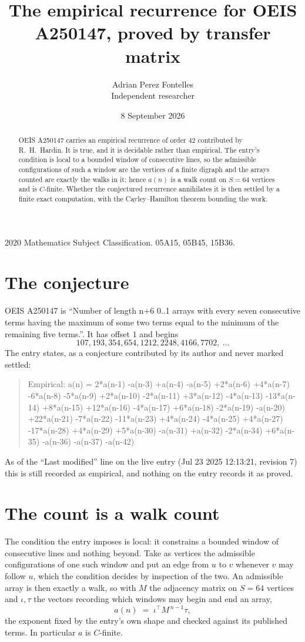 \documentclass[11pt,a4paper]{article}
\title{The empirical recurrence for OEIS A250147, proved by transfer matrix}
\author{Adrian Perez Fontelles\\ \small Independent researcher}
\date{8 September 2026}
\theoremstyle{plain}
\theoremstyle{definition}
\begin{document}
\maketitle

\begin{abstract}
OEIS A250147 carries an empirical recurrence of order $42$ contributed by R.~H.~Hardin. It is
true, and it is decidable rather than empirical. The entry's condition is local to a bounded window of consecutive lines, so
the admissible configurations of such a window are the vertices of a finite digraph and the
arrays counted are exactly the walks in it; hence $a(n)$ is a walk count on $S=64$ vertices
and is $C$-finite. Whether the conjectured recurrence annihilates it is then settled by a
finite exact computation, with the Cayley--Hamilton theorem bounding the work.
\end{abstract}

\noindent\small 2020 Mathematics Subject Classification. 05A15, 05B45, 15B36.\normalsize

\section{The conjecture}

OEIS A250147 is ``Number of length n+6 0..1 arrays with every seven consecutive terms having the maximum of some two terms equal to the minimum of the remaining five terms.''. It has offset $1$ and begins
\[
107, 193, 354, 654, 1212, 2248, 4166, 7702,\ \dots
\]
The entry states, as a conjecture contributed by its author and never marked settled:
\begin{quote}
Empirical: a(n) = 2*a(n-1) -a(n-3) +a(n-4) -a(n-5) +2*a(n-6) +4*a(n-7) -6*a(n-8) -5*a(n-9) +2*a(n-10) -2*a(n-11) +3*a(n-12) -4*a(n-13) -13*a(n-14) +8*a(n-15) +12*a(n-16) -4*a(n-17) +6*a(n-18) -2*a(n-19) -a(n-20) +22*a(n-21) -7*a(n-22) -11*a(n-23) +4*a(n-24) -4*a(n-25) +4*a(n-27) -17*a(n-28) +4*a(n-29) +5*a(n-30) -a(n-31) +a(n-32) -2*a(n-34) +6*a(n-35) -a(n-36) -a(n-37) -a(n-42)
\end{quote}
As of the ``Last modified'' line on the live entry (Jul 23 2025 12:13:21, revision 7) this is still
recorded as empirical, and nothing on the entry records it as proved.

\section{The count is a walk count}

The condition the entry imposes is local: it constrains a bounded window of consecutive lines and nothing beyond. Take as
vertices the admissible configurations of one such window and put an edge from $u$ to $v$
whenever $v$ may follow $u$, which the condition decides by inspection of the two. An
admissible array is then exactly a walk, so with $M$ the adjacency matrix on $S=64$ vertices
and $\iota,\tau$ the vectors recording which windows may begin and end an array,
\[
a(n)\;=\;\iota^{\!\top}M^{\,n-1}\tau ,
\]
the exponent fixed by the entry's own shape and checked against its published terms. In
particular $a$ is $C$-finite.
\end{document}
